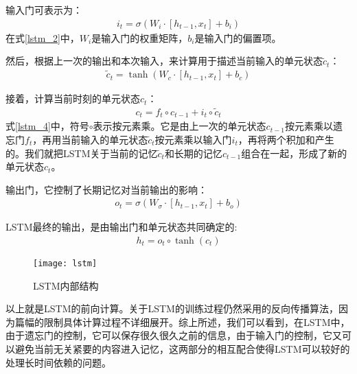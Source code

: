 输入门可表示为：
\begin{equation}
\label{lstm_2}
\begin{aligned}
i_{t}=\sigma (W_{i} \cdot [h_{t-1}, x_{t}]+b_{i})
\end{aligned}
\end{equation}
在式\eqref{lstm_2}中，$W_{i}$是输入门的权重矩阵，$b_{i}$是输入门的偏置项。

然后，根据上一次的输出和本次输入，来计算用于描述当前输入的单元状态$\tilde{c}_{t}$：
\begin{equation}
\label{lstm_3}
\begin{aligned}
\tilde{c}_{t}=\tanh (W_{c} \cdot [h_{t-1}, x_{t}]+b_{c})
\end{aligned}
\end{equation}

接着，计算当前时刻的单元状态$c_{t}$：
\begin{equation}
\label{lstm_4}
\begin{aligned}
c_{t}=f_{t} \circ c_{t-1} + i_{t} \circ \tilde{c}_{t}
\end{aligned}
\end{equation}
式\eqref{lstm_4}中，符号$\circ$表示按元素乘。它是由上一次的单元状态$c_{t-1}$按元素乘以遗忘门$f_{t}$，再用当前输入的单元状态$\tilde{c}_{t}$按元素乘以输入门$i_{t}$，再将两个积加和产生的。我们就把LSTM关于当前的记忆$\tilde{c}_{t}$和长期的记忆$c_{t-1}$组合在一起，形成了新的单元状态$c_{t}$。

输出门，它控制了长期记忆对当前输出的影响：
\begin{equation}
\begin{aligned}
o_{t}=\sigma(W_{\sigma} \cdot [h_{t-1}, x_{t}]+b_{o})
\end{aligned}
\end{equation}

LSTM最终的输出，是由输出门和单元状态共同确定的:
\begin{equation}
\begin{aligned}
h_{t}=o_{t} \circ \tanh(c_{t})
\end{aligned}
\end{equation}

\begin{figure}[htbp]
\centering
\texttt{[image: lstm]}
\caption{LSTM内部结构}
\label{fig:lstm}
\end{figure}

以上就是LSTM的前向计算。关于LSTM的训练过程仍然采用的反向传播算法，因为篇幅的限制具体计算过程不详细展开。综上所述，我们可以看到，在LSTM中，由于遗忘门的控制，它可以保存很久很久之前的信息，由于输入门的控制，它又可以避免当前无关紧要的内容进入记忆，这两部分的相互配合使得LSTM可以较好的处理长时间依赖的问题。


